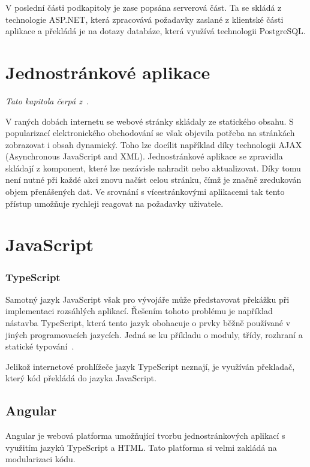 V poslední části podkapitoly je zase popsána serverová část. Ta se skládá z technologie ASP.NET, která zpracovává požadavky zaslané z klientské části aplikace a překládá je na dotazy databáze, která využívá technologii PostgreSQL.


\section{Jednostránkové aplikace}\label{sec:spa}

\emph{Tato kapitola čerpá z~\cite{bib:spa}}.

V raných dobách internetu se webové stránky skládaly ze statického obsahu. S popularizací elektronického obchodování se však objevila potřeba na stránkách zobrazovat i obsah dynamický. 
Toho lze docílit například díky technologii AJAX (Asynchronous JavaScript and XML). Jednostránkové aplikace se zpravidla skládají z komponent, které lze nezávisle nahradit nebo aktualizovat. Díky tomu není nutné při každé akci znovu načíst celou stránku, čímž je značně zredukován objem přenášených dat. Ve srovnání s vícestránkovými aplikacemi tak tento přístup umožňuje rychleji reagovat na požadavky uživatele.

\blindtext %

\section{JavaScript}
\blindtext

\subsubsection{TypeScript}
Samotný jazyk JavaScript však pro vývojáře může představovat překážku při implementaci rozsáhlých aplikací. %
Řešením tohoto problému je například nástavba TypeScript, která tento jazyk obohacuje o prvky běžně používané v jiných programovacích jazycích. Jedná se ku příkladu o moduly, třídy, rozhraní a statické typování~\cite{bib:typescript}.
 
Jelikož internetové prohlížeče jazyk TypeScript neznají, je využíván překladač, který kód překládá do jazyka JavaScript.

\blindtext

\subsection{Angular}
Angular je webová platforma umožňující tvorbu jednostránkových aplikací s využitím jazyků TypeScript a HTML. Tato platforma si velmi zakládá na modularizaci kódu.
\blindtext[2] %

